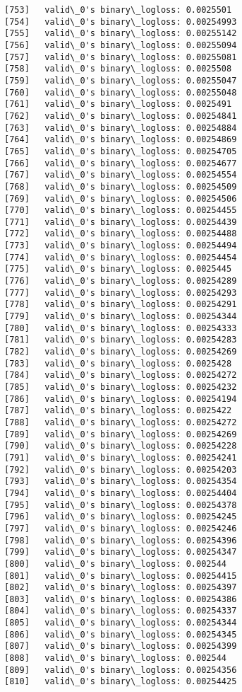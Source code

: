 \documentclass[11pt]{article}
\begin{document}
\begin{Verbatim}[commandchars=\\\{\}]
[753]	valid\_0's binary\_logloss: 0.0025501
[754]	valid\_0's binary\_logloss: 0.00254993
[755]	valid\_0's binary\_logloss: 0.00255142
[756]	valid\_0's binary\_logloss: 0.00255094
[757]	valid\_0's binary\_logloss: 0.00255081
[758]	valid\_0's binary\_logloss: 0.0025508
[759]	valid\_0's binary\_logloss: 0.00255047
[760]	valid\_0's binary\_logloss: 0.00255048
[761]	valid\_0's binary\_logloss: 0.0025491
[762]	valid\_0's binary\_logloss: 0.00254841
[763]	valid\_0's binary\_logloss: 0.00254884
[764]	valid\_0's binary\_logloss: 0.00254869
[765]	valid\_0's binary\_logloss: 0.00254705
[766]	valid\_0's binary\_logloss: 0.00254677
[767]	valid\_0's binary\_logloss: 0.00254554
[768]	valid\_0's binary\_logloss: 0.00254509
[769]	valid\_0's binary\_logloss: 0.00254506
[770]	valid\_0's binary\_logloss: 0.00254455
[771]	valid\_0's binary\_logloss: 0.00254439
[772]	valid\_0's binary\_logloss: 0.00254488
[773]	valid\_0's binary\_logloss: 0.00254494
[774]	valid\_0's binary\_logloss: 0.00254454
[775]	valid\_0's binary\_logloss: 0.0025445
[776]	valid\_0's binary\_logloss: 0.00254289
[777]	valid\_0's binary\_logloss: 0.00254293
[778]	valid\_0's binary\_logloss: 0.00254291
[779]	valid\_0's binary\_logloss: 0.00254344
[780]	valid\_0's binary\_logloss: 0.00254333
[781]	valid\_0's binary\_logloss: 0.00254283
[782]	valid\_0's binary\_logloss: 0.00254269
[783]	valid\_0's binary\_logloss: 0.0025428
[784]	valid\_0's binary\_logloss: 0.00254272
[785]	valid\_0's binary\_logloss: 0.00254232
[786]	valid\_0's binary\_logloss: 0.00254194
[787]	valid\_0's binary\_logloss: 0.0025422
[788]	valid\_0's binary\_logloss: 0.00254272
[789]	valid\_0's binary\_logloss: 0.00254269
[790]	valid\_0's binary\_logloss: 0.00254228
[791]	valid\_0's binary\_logloss: 0.00254241
[792]	valid\_0's binary\_logloss: 0.00254203
[793]	valid\_0's binary\_logloss: 0.00254354
[794]	valid\_0's binary\_logloss: 0.00254404
[795]	valid\_0's binary\_logloss: 0.00254378
[796]	valid\_0's binary\_logloss: 0.00254245
[797]	valid\_0's binary\_logloss: 0.00254246
[798]	valid\_0's binary\_logloss: 0.00254396
[799]	valid\_0's binary\_logloss: 0.00254347
[800]	valid\_0's binary\_logloss: 0.002544
[801]	valid\_0's binary\_logloss: 0.00254415
[802]	valid\_0's binary\_logloss: 0.00254397
[803]	valid\_0's binary\_logloss: 0.00254386
[804]	valid\_0's binary\_logloss: 0.00254337
[805]	valid\_0's binary\_logloss: 0.00254344
[806]	valid\_0's binary\_logloss: 0.00254345
[807]	valid\_0's binary\_logloss: 0.00254399
[808]	valid\_0's binary\_logloss: 0.002544
[809]	valid\_0's binary\_logloss: 0.00254356
[810]	valid\_0's binary\_logloss: 0.00254425

\end{Verbatim}
\end{document}
